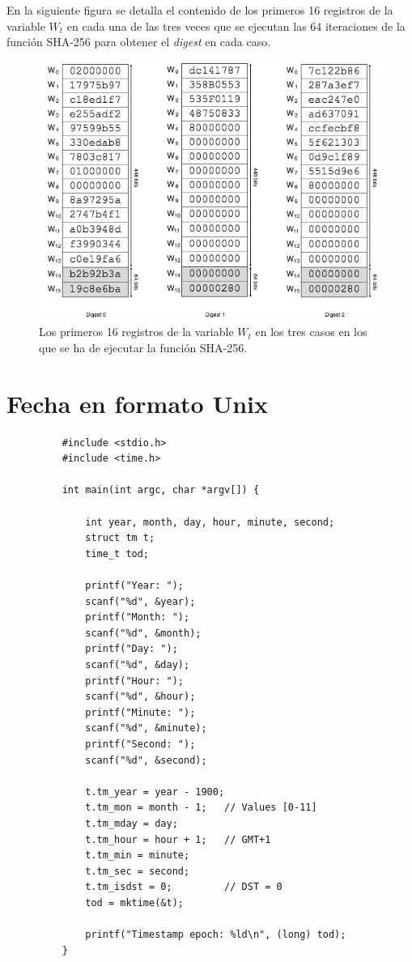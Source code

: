 \documentclass{article}
\begin{document}
    \vspace{3mm}
    En la siguiente figura se detalla el contenido de los primeros 16 registros de la variable $W_{t}$ en cada una de las tres veces que se ejecutan las 64 iteraciones de la función SHA-256 para obtener el \textit{digest} en cada caso.
    \begin{figure}[H]
    \centering
        \includegraphics[scale=0.59]{img/Bitcoin_block_SHA_256_W0_W15_x3}
        \caption{Los primeros 16 registros de la variable $W_{t}$ en los tres casos en los que se ha de ejecutar la función SHA-256.}
    \end{figure}
\section{Fecha en formato Unix}
    \begin{figure}[H]
    \centering
        \begin{verbatim}
    #include <stdio.h>
    #include <time.h>
    
    int main(int argc, char *argv[]) {
    
    	int year, month, day, hour, minute, second;
    	struct tm t;
    	time_t tod;
    
    	printf("Year: ");
    	scanf("%d", &year);
    	printf("Month: ");
    	scanf("%d", &month);
    	printf("Day: ");
    	scanf("%d", &day);
    	printf("Hour: ");
    	scanf("%d", &hour);
    	printf("Minute: ");
    	scanf("%d", &minute);
    	printf("Second: ");
    	scanf("%d", &second);
    
    	t.tm_year = year - 1900;
    	t.tm_mon = month - 1;   // Values [0-11]
    	t.tm_mday = day;
    	t.tm_hour = hour + 1;   // GMT+1
    	t.tm_min = minute;
    	t.tm_sec = second;
    	t.tm_isdst = 0;         // DST = 0
    	tod = mktime(&t);
    
    	printf("Timestamp epoch: %ld\n", (long) tod);
    }
        \end{verbatim}
    \end{figure}
\end{document}
